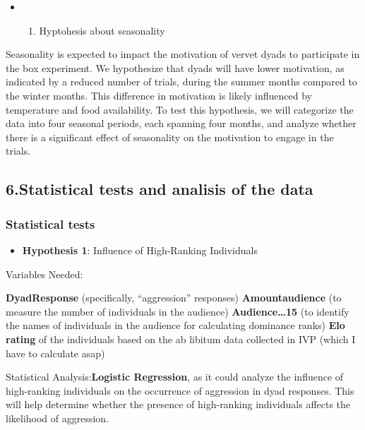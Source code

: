 \documentclass[
]{article}
\providecommand{\tightlist}{%
  \setlength{\itemsep}{0pt}\setlength{\parskip}{0pt}}
\begin{document}
\begin{itemize}
\item
  \begin{enumerate}
  \def\labelenumi{\arabic{enumi}.}
  \setcounter{enumi}{4}
  \tightlist
  \item
    Hyptohesis about seasonality
  \end{enumerate}
\end{itemize}

Seasonality is expected to impact the motivation of vervet dyads to
participate in the box experiment. We hypothesize that dyads will have
lower motivation, as indicated by a reduced number of trials, during the
summer months compared to the winter months. This difference in
motivation is likely influenced by temperature and food availability. To
test this hypothesis, we will categorize the data into four seasonal
periods, each spanning four months, and analyze whether there is a
significant effect of seasonality on the motivation to engage in the
trials.

\hypertarget{statistical-tests-and-analisis-of-the-data}{%
\subsection{6.Statistical tests and analisis of the
data}\label{statistical-tests-and-analisis-of-the-data}}

\hypertarget{statistical-tests}{%
\subsubsection{Statistical tests}\label{statistical-tests}}

\begin{itemize}
\tightlist
\item
  \textbf{Hypothesis 1}: Influence of High-Ranking Individuals
\end{itemize}

Variables Needed:

\textbf{DyadResponse} (specifically, ``aggression'' responses)
\textbf{Amountaudience} (to measure the number of individuals in the
audience) \textbf{Audience\ldots15} (to identify the names of
individuals in the audience for calculating dominance ranks) \textbf{Elo
rating} of the individuals based on the ab libitum data collected in IVP
(which I have to calculate asap)

Statistical Analysis:\textbf{Logistic Regression}, as it could analyze
the influence of high-ranking individuals on the occurrence of
aggression in dyad responses. This will help determine whether the
presence of high-ranking individuals affects the likelihood of
aggression.
\end{document}
